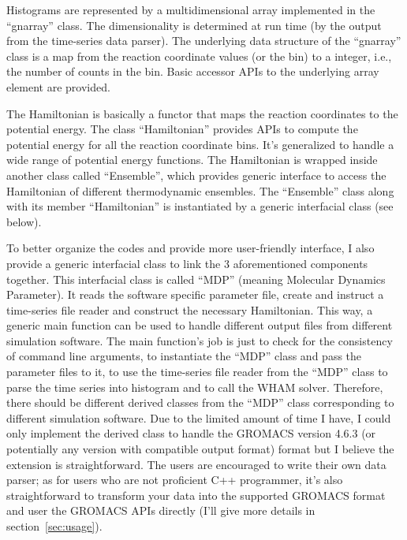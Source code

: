 Histograms are represented by a multidimensional array implemented in the
``gnarray'' class. The dimensionality is determined at run time (by the output 
from the time-series data parser). The underlying data structure of the 
``gnarray'' class is a map from the reaction coordinate values (or the bin)
to a integer, i.e., the number of counts in the bin. Basic accessor APIs
to the underlying array element are provided.

The Hamiltonian is basically a functor that maps the reaction coordinates 
to the potential energy. The class ``Hamiltonian'' provides APIs to 
compute the potential energy for all the reaction coordinate bins. It's 
generalized to handle a wide range of potential energy functions. The 
Hamiltonian is wrapped inside another class called ``Ensemble'', 
which provides generic interface to access the Hamiltonian of different 
thermodynamic ensembles. The ``Ensemble'' class along with its member
``Hamiltonian'' is instantiated by a generic interfacial class (see below).

To better organize the codes and provide more user-friendly interface, I also
provide a generic interfacial class to link the 3 aforementioned components
together. This interfacial class is called ``MDP'' (meaning Molecular Dynamics
Parameter). It reads the software specific parameter file, create and instruct
a time-series file reader and construct the necessary Hamiltonian. This way, a
generic main function can be used to handle different output files from
different simulation software. The main function's job is just to check for the
consistency of command line arguments, to instantiate the ``MDP'' class and
pass the parameter files to it, to use the time-series file reader from the
``MDP'' class to parse the time series into histogram and to call the WHAM
solver. Therefore, there should be different derived classes from the ``MDP''
class corresponding to different simulation software. Due to the limited amount
of time I have, I could only implement the derived class to handle the GROMACS
version 4.6.3 (or potentially any version with compatible output format) format
but I believe the extension is straightforward. The users are encouraged to
write their own data parser; as for users who are not proficient C++
programmer, it's also straightforward to transform your data into the supported
GROMACS format and user the GROMACS APIs directly (I'll give more details
in section~\ref{sec:usage}).
